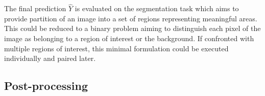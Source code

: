 
The final prediction $\hat{Y}$ is evaluated on the segmentation task which aims to provide partition of an image into a set of regions representing meaningful areas. This could be reduced to a binary problem aiming to distinguish each pixel of the image as belonging to a region of interest or the background. If confronted with multiple regions of interest, this minimal formulation could be executed individually and paired later. %


%

\subsection{Post-processing}
\label{ssec:post_processing}


